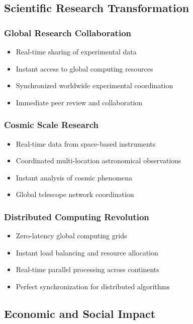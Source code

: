 \documentclass[12pt,a4paper]{article}
\begin{document}
\subsection{Scientific Research Transformation}

\subsubsection{Global Research Collaboration}
\begin{itemize}
\item Real-time sharing of experimental data
\item Instant access to global computing resources
\item Synchronized worldwide experimental coordination
\item Immediate peer review and collaboration
\end{itemize}

\subsubsection{Cosmic Scale Research}
\begin{itemize}
\item Real-time data from space-based instruments
\item Coordinated multi-location astronomical observations
\item Instant analysis of cosmic phenomena
\item Global telescope network coordination
\end{itemize}

\subsubsection{Distributed Computing Revolution}
\begin{itemize}
\item Zero-latency global computing grids
\item Instant load balancing and resource allocation
\item Real-time parallel processing across continents
\item Perfect synchronization for distributed algorithms
\end{itemize}

\subsection{Economic and Social Impact}
\end{document}
